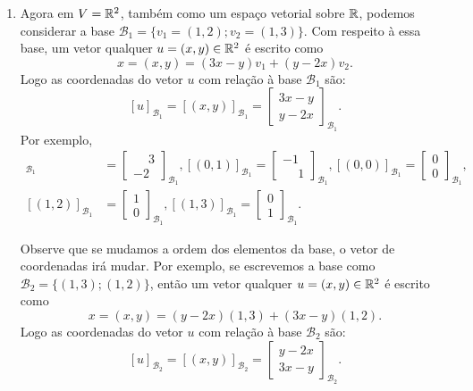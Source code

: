 \begin{exemplos}
\begin{enumerate}
    \item Agora em $V = \mathbb{R}^2$, também como um espaço vetorial sobre $\mathbb{R}$, podemos considerar a base $\mathcal{B}_1 = \{v_1 = (1, 2); v_2 = (1, 3)\}$. Com respeito à essa base, um vetor qualquer $u = (x, y) \in \mathbb{R}^2$ é escrito como
      \[
        x = (x, y) = (3x - y)v_1 + (y - 2x)v_2.
      \]
      Logo as coordenadas do vetor $u$ com relação à base $\mathcal{B}_1$ são:
      \[
        [u]_{\mathcal{B}_1} = [(x, y)]_{\mathcal{B}_1} = \begin{bmatrix}3x - y\\y - 2x\end{bmatrix}_{\mathcal{B}_1}.
      \]
      Por exemplo,
      \begin{align*}
        [(1, 0)]_{\mathcal{B}_1} &= \begin{bmatrix}\phantom{-}3\\-2\end{bmatrix}_{\mathcal{B}_1},
        [(0, 1)]_{\mathcal{B}_1} = \begin{bmatrix}-1\\\phantom{-}1\end{bmatrix}_{\mathcal{B}_1},
        [(0, 0)]_{\mathcal{B}_1} = \begin{bmatrix}0\\0\end{bmatrix}_{\mathcal{B}_1},\\
        [(1, 2)]_{\mathcal{B}_1} &= \begin{bmatrix}1\\0\end{bmatrix}_{\mathcal{B}_1},
        [(1, 3)]_{\mathcal{B}_1} = \begin{bmatrix}0\\1\end{bmatrix}_{\mathcal{B}_1}.
      \end{align*}

      Observe que se mudamos a ordem dos elementos da base, o vetor de coordenadas irá mudar. Por exemplo, se escrevemos a base como $\mathcal{B}_2 = \{(1, 3); (1, 2)\}$, então um vetor qualquer $u = (x, y) \in \mathbb{R}^2$ é escrito como
      \[
        x = (x, y) = (y - 2x)(1, 3) + (3x - y)(1, 2).
      \]
      Logo as coordenadas do vetor $u$ com relação à base $\mathcal{B}_2$ são:
      \[
        [u]_{\mathcal{B}_2} = [(x, y)]_{\mathcal{B}_2} = \begin{bmatrix}y - 2x\\3x - y\end{bmatrix}_{\mathcal{B}_2}.
      \]
      

\end{enumerate}
\end{exemplos}
